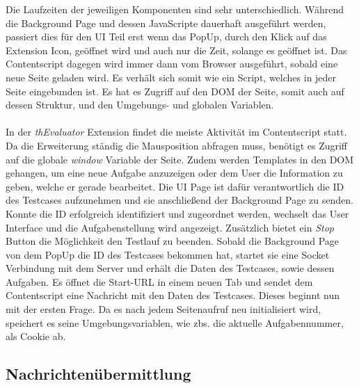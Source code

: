 Die Laufzeiten der jeweiligen Komponenten sind sehr unterschiedlich. Während die Background Page und dessen JavaScripte dauerhaft ausgeführt werden, passiert dies für den UI Teil erst wenn das PopUp, durch den Klick auf das Extension Icon, geöffnet wird und auch nur die Zeit, solange es geöffnet ist. Das Contentscript dagegen wird immer dann vom Browser ausgeführt, sobald eine neue Seite geladen wird. Es verhält sich somit wie ein Script, welches in jeder Seite eingebunden ist. Es hat es Zugriff auf den DOM der Seite, somit auch auf dessen Struktur, und den Umgebungs- und globalen Variablen.\\
\\
In der \textit{thEvaluator} Extension findet die meiste Aktivität im Contentscript statt. Da die Erweiterung ständig die Mausposition abfragen muss, benötigt es Zugriff auf die globale \textit{window} Variable der Seite. Zudem werden Templates in den DOM gehangen, um eine neue Aufgabe anzuzeigen oder dem User die Information zu geben, welche er gerade bearbeitet. Die UI Page ist dafür verantwortlich die ID des Testcases aufzunehmen und sie anschließend der Background Page zu senden. Konnte die ID erfolgreich identifiziert und zugeordnet werden, wechselt das User Interface und die Aufgabenstellung wird angezeigt. Zusätzlich bietet ein \textit{Stop} Button die Möglichkeit den Testlauf zu beenden. Sobald die Background Page von dem PopUp die ID des Testcases bekommen hat, startet sie eine Socket Verbindung mit dem Server und erhält die Daten des Testcases, sowie dessen Aufgaben. Es öffnet die Start-URL in einem neuen Tab und sendet dem Contentscript eine Nachricht mit den Daten des Testcases. Dieses beginnt nun mit der ersten Frage. Da es nach jedem Seitenaufruf neu initialisiert wird, speichert es seine Umgebungsvariablen, wie zbs. die aktuelle Aufgabennummer, als Cookie ab.


\subsection{Nachrichtenübermittlung}

